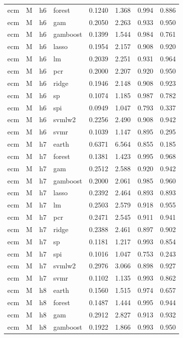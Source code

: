 \begin{ThreePartTable}
\begin{longtable}[t]{llclcccc}
ecm & M & h6 & forest & 0.1240 & 1.368 & 0.994 & 0.886\\
ecm & M & h6 & gam & 0.2050 & 2.263 & 0.933 & 0.950\\
ecm & M & h6 & gamboost & 0.1399 & 1.544 & 0.984 & 0.761\\
ecm & M & h6 & lasso & 0.1954 & 2.157 & 0.908 & 0.920\\
ecm & M & h6 & lm & 0.2039 & 2.251 & 0.931 & 0.964\\
ecm & M & h6 & pcr & 0.2000 & 2.207 & 0.920 & 0.950\\
ecm & M & h6 & ridge & 0.1946 & 2.148 & 0.908 & 0.923\\
ecm & M & h6 & sp & 0.1074 & 1.185 & 0.987 & 0.782\\
ecm & M & h6 & spi & 0.0949 & 1.047 & 0.793 & 0.337\\
ecm & M & h6 & svmlw2 & 0.2256 & 2.490 & 0.908 & 0.942\\
ecm & M & h6 & svmr & 0.1039 & 1.147 & 0.895 & 0.295\\
\addlinespace
ecm & M & h7 & earth & 0.6371 & 6.564 & 0.855 & 0.185\\
ecm & M & h7 & forest & 0.1381 & 1.423 & 0.995 & 0.968\\
ecm & M & h7 & gam & 0.2512 & 2.588 & 0.920 & 0.942\\
ecm & M & h7 & gamboost & 0.2000 & 2.061 & 0.985 & 0.960\\
ecm & M & h7 & lasso & 0.2392 & 2.464 & 0.893 & 0.893\\
ecm & M & h7 & lm & 0.2503 & 2.579 & 0.918 & 0.955\\
ecm & M & h7 & pcr & 0.2471 & 2.545 & 0.911 & 0.941\\
ecm & M & h7 & ridge & 0.2388 & 2.461 & 0.897 & 0.902\\
ecm & M & h7 & sp & 0.1181 & 1.217 & 0.993 & 0.854\\
ecm & M & h7 & spi & 0.1016 & 1.047 & 0.753 & 0.243\\
ecm & M & h7 & svmlw2 & 0.2976 & 3.066 & 0.898 & 0.927\\
ecm & M & h7 & svmr & 0.1102 & 1.135 & 0.993 & 0.862\\
\addlinespace
ecm & M & h8 & earth & 0.1560 & 1.515 & 0.974 & 0.657\\
ecm & M & h8 & forest & 0.1487 & 1.444 & 0.995 & 0.944\\
ecm & M & h8 & gam & 0.2912 & 2.827 & 0.913 & 0.932\\
ecm & M & h8 & gamboost & 0.1922 & 1.866 & 0.993 & 0.950\\

\end{longtable}
\end{ThreePartTable}
